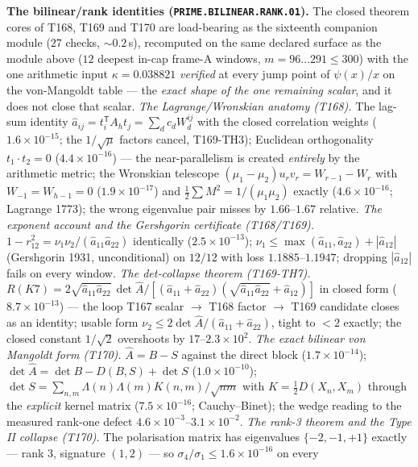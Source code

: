 \documentclass[11pt,a4paper]{article}
\theoremstyle{definition}
\begin{document}
\par\smallskip\noindent\textbf{The bilinear/rank identities
(\texttt{PRIME.BILINEAR.RANK.01}).}
The closed theorem cores of T168, T169 and T170 are load-bearing as the
sixteenth companion module ($27$ checks, ${\sim}0.2$\,s), recomputed on
the same declared surface as the module above ($12$ deepest in-cap
frame-A windows, $m=96\ldots291\le300$) with the one arithmetic input
$\kappa=0.038821$ \emph{verified} at every jump point of $\psi(x)/x$ on
the von-Mangoldt table --- the \emph{exact shape of the one remaining
scalar}, and it does not close that scalar.
\emph{The Lagrange/Wronskian anatomy (T168).} The lag-sum identity
$\hat a_{ij}=t_i^{\mathsf T}A_ht_j=\sum_d c_dW^{ij}_d$ with the closed
correlation weights ($1.6\times10^{-15}$; the $1/\sqrt{\mu}$ factors
cancel, T169-TH3); Euclidean orthogonality $t_1\cdot t_2=0$
($4.4\times10^{-16}$) --- the near-parallelism is created \emph{entirely}
by the arithmetic metric; the Wronskian telescope
$(\mu_1-\mu_2)u_rv_r=W_{r-1}-W_r$ with $W_{-1}=W_{h-1}=0$
($1.9\times10^{-17}$) and $\tfrac12\sum M^2=1/(\mu_1\mu_2)$ exactly
($4.6\times10^{-16}$; Lagrange 1773); the wrong eigenvalue pair misses by
$1.66$--$1.67$ relative.
\emph{The exponent account and the Gershgorin certificate (T168/T169).}
$1-r_{12}^2=\nu_1\nu_2/(\hat a_{11}\hat a_{22})$ identically
($2.5\times10^{-13}$); $\nu_1\le\max(\hat a_{11},\hat a_{22})+|\hat a_{12}|$
(Gershgorin 1931, unconditional) on $12/12$ with loss $1.1885$--$1.1947$;
dropping $|\hat a_{12}|$ fails on every window.
\emph{The det-collapse theorem (T169-TH7).}
$R(K7)=2\sqrt{\hat a_{11}\hat a_{22}}\,\det\hat A/[(\hat a_{11}+\hat a_{22})
(\sqrt{\hat a_{11}\hat a_{22}}+\hat a_{12})]$ in closed form
($8.7\times10^{-13}$) --- the loop T167 scalar $\to$ T168 factor $\to$
T169 candidate closes as an identity; usable form
$\nu_2\le2\det\hat A/(\hat a_{11}+\hat a_{22})$, tight to $<2$ exactly;
the closed constant $1/\sqrt2$ overshoots by $17$--$2.3\times10^{2}$.
\emph{The exact bilinear von Mangoldt form (T170).} $\hat A=B-S$ against
the direct block ($1.7\times10^{-14}$);
$\det\hat A=\det B-D(B,S)+\det S$ ($1.0\times10^{-10}$); $\det S=
\sum_{n,m}\Lambda(n)\Lambda(m)K(n,m)/\sqrt{nm}$ with
$K=\tfrac12D(X_n,X_m)$ through the \emph{explicit} kernel matrix
($7.5\times10^{-16}$; Cauchy--Binet); the wedge reading to the measured
rank-one defect $4.6\times10^{-3}$--$3.1\times10^{-2}$.
\emph{The rank-3 theorem and the Type II collapse (T170).} The
polarisation matrix has eigenvalues $\{-2,-1,+1\}$ exactly --- rank $3$,
signature $(1,2)$ --- so $\sigma_4/\sigma_1\le1.6\times10^{-16}$ on every
\end{document}
